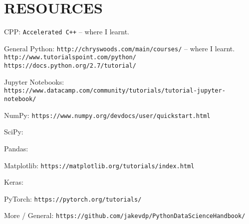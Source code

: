 \section{RESOURCES}

CPP:
\newline
\texttt{Accelerated C++} -- where I learnt.

General Python:
\newline
\texttt{http://chryswoods.com/main/courses/} -- where I learnt.
\newline
\texttt{http://www.tutorialspoint.com/python/}
\newline
\texttt{https://docs.python.org/2.7/tutorial/}

Jupyter Notebooks:
\newline
\texttt{https://www.datacamp.com/community/tutorials/tutorial-jupyter-notebook/}

NumPy:
\newline
\texttt{https://www.numpy.org/devdocs/user/quickstart.html}

SciPy:

Pandas:

Matplotlib:
\newline
\texttt{https://matplotlib.org/tutorials/index.html}

Keras:

PyTorch:
\newline
\texttt{https://pytorch.org/tutorials/}

More / General:
\newline
\texttt{https://github.com/jakevdp/PythonDataScienceHandbook/}